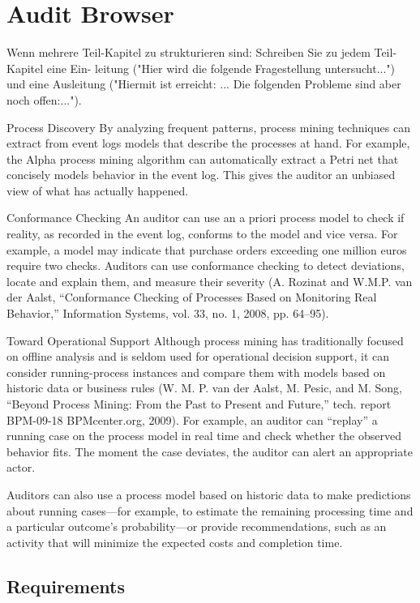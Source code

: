 %
\chapter{Audit Browser}

Wenn mehrere Teil-Kapitel zu strukturieren sind: Schreiben Sie zu jedem Teil-Kapitel eine Ein- leitung ("Hier wird die folgende Fragestellung untersucht...") und eine Ausleitung ("Hiermit ist erreicht: ... Die folgenden Probleme sind aber noch offen:...").

Process Discovery \cite{5427384}
By analyzing frequent patterns, process mining techniques can extract from event logs models that describe the processes at hand. For example, the Alpha process mining algorithm can automatically extract a Petri net that concisely models behavior in the event log. This gives the auditor an unbiased view of what has actually happened.

Conformance Checking
An auditor can use an a priori process model to check if reality, as recorded in the event log, conforms to the model and vice versa. For example, a model may indicate that purchase orders exceeding one million euros require two checks. Auditors can use conformance checking to detect deviations, locate and explain them, and measure their severity (A. Rozinat and W.M.P. van der Aalst, “Conformance Checking of Processes Based on Monitoring Real Behavior,” Information Systems, vol. 33, no. 1, 2008, pp. 64–95).

Toward Operational Support
Although process mining has traditionally focused on offline analysis and is seldom used for operational decision support, it can consider running-process instances and compare them with models based on historic data or business rules (W. M. P. van der Aalst, M. Pesic, and M. Song, “Beyond Process Mining: From the Past to Present and Future,” tech. report BPM-09-18 BPMcenter.org, 2009). For example, an auditor can “replay” a running case on the process model in real time and check whether the observed behavior fits. The moment the case deviates, the auditor can alert an appropriate actor.

Auditors can also use a process model based on historic data to make predictions about running cases—for example, to estimate the remaining processing time and a particular outcome's probability—or provide recommendations, such as an activity that will minimize the expected costs and completion time.

\section{Requirements}

